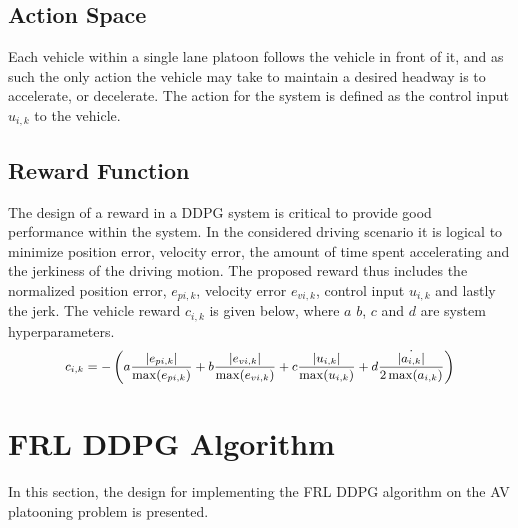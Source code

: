 \subsection{Action Space}
Each vehicle within a single lane platoon follows the vehicle in front of it, and as 
such the only action the vehicle may take to maintain a desired headway is to accelerate, 
or decelerate. The action for the system is defined as the control input $u_{i,k}$ to the 
vehicle.

\subsection{Reward Function}
The design of a reward in a DDPG system is critical to provide good performance within 
the system.  In the considered driving scenario it is logical to minimize position error, 
velocity error, the amount of time spent accelerating and the jerkiness of the driving 
motion.  The proposed reward thus includes the normalized position error, $e_{pi,k}$, 
velocity error $e_{vi,k}$, control input $u_{i,k}$ and lastly the jerk. The vehicle 
reward $c_{i,k}$ is given below, where $a$ $b$, $c$ and $d$ are system hyperparameters.
\begin{equation} \label{eqn:rewardB}
\small
\begin{aligned}
    c_{i,k} &= -\left(a\frac{|e_{pi,k}|}{\max(e_{pi,k})} + b\frac{|e_{vi,k}|}{\max(e_{vi,k})} + c\frac{|u_{i,k}|}{\max(u_{i,k})} +  d\frac{\dot{|a_{i,k}|}}{2\max(a_{i,k})}\right) \\
\end{aligned}
\end{equation}

\section{FRL DDPG Algorithm}
In this section, the design for implementing the FRL DDPG algorithm on the AV platooning 
problem is presented. 
